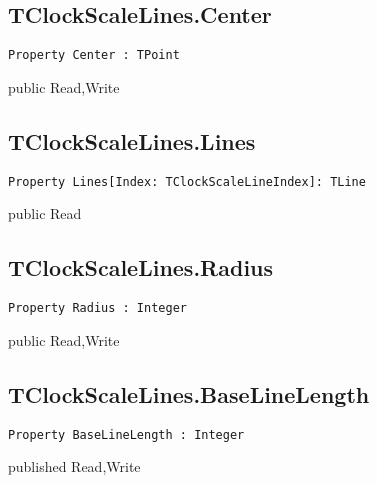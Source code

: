 \subsection{TClockScaleLines.Center}
\label{hmi:retroclock:tclockscalelines:center}
\begin{FPCList}
\Declaration 

\begin{verbatim}
Property Center : TPoint
\end{verbatim}
\Visibility
public
\Access
Read,Write
\end{FPCList}
\subsection{TClockScaleLines.Lines}
\label{hmi:retroclock:tclockscalelines:lines}
\begin{FPCList}
\Declaration 

\begin{verbatim}
Property Lines[Index: TClockScaleLineIndex]: TLine
\end{verbatim}
\Visibility
public
\Access
Read
\end{FPCList}
\subsection{TClockScaleLines.Radius}
\label{hmi:retroclock:tclockscalelines:radius}
\begin{FPCList}
\Declaration 

\begin{verbatim}
Property Radius : Integer
\end{verbatim}
\Visibility
public
\Access
Read,Write
\end{FPCList}
\subsection{TClockScaleLines.BaseLineLength}
\label{hmi:retroclock:tclockscalelines:baselinelength}
\begin{FPCList}
\Declaration 

\begin{verbatim}
Property BaseLineLength : Integer
\end{verbatim}
\Visibility
published
\Access
Read,Write
\end{FPCList}
